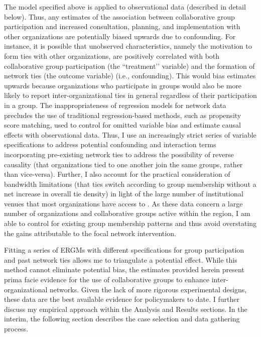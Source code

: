 \documentclass[12pt,a4paper,titlepage]{article}
\begin{document}
The model specified above is applied to observational data (described in detail below). Thus, any estimates of the association between collaborative group participation and increased consultation, planning, and implementation with other organizations are potentially biased upwards due to confounding. For instance, it is possible that unobserved characteristics, namely the motivation to form ties with other organizations, are positively correlated with both collaborative group participation (the ``treatment’’ variable) and the formation of network ties (the outcome variable) (i.e., confounding). This would bias estimates upwards because organizations who participate in groups would also be more likely to report inter-organizational ties in general regardless of their participation in a group. The inappropriateness of regression models for network data \parencite{kolaczyk2009,krackhardt1988} precludes the use of traditional regression-based methods, such as propensity score matching, used to control for omitted variable bias and estimate causal effects with observational data. Thus, I use an increasingly strict series of variable specifications to address potential confounding and interaction terms incorporating pre-existing network ties to address the possibility of reverse causality (that organizations tied to one another join the same groups, rather than vice-versa). Further, I also account for the practical consideration of bandwidth limitations (that ties switch according to group membership without a net increase in overall tie density) in light of the large number of institutional venues that most organizations have access to \parencite{berardo2010,lubell2010,lubell2011-a,mcallister2014, smaldino2014,niles2012, gerlak2012}. As these data concern a large number of organizations and collaborative groups active within the region, I am able to control for existing group membership patterns and thus avoid overstating the gains attributable to the focal network intervention.

Fitting a series of ERGMs with different specifications for group participation and past network ties allows me to triangulate a potential effect. While this method cannot eliminate potential bias, the estimates provided herein present prima facie evidence for the use of collaborative groups to enhance inter-organizational networks. Given the lack of more rigorous experimental designs, these data are the best available evidence for policymakers to date. I further discuss my empirical approach within the Analysis and Results sections. In the interim, the following section describes the case selection and data gathering process.
\end{document}
